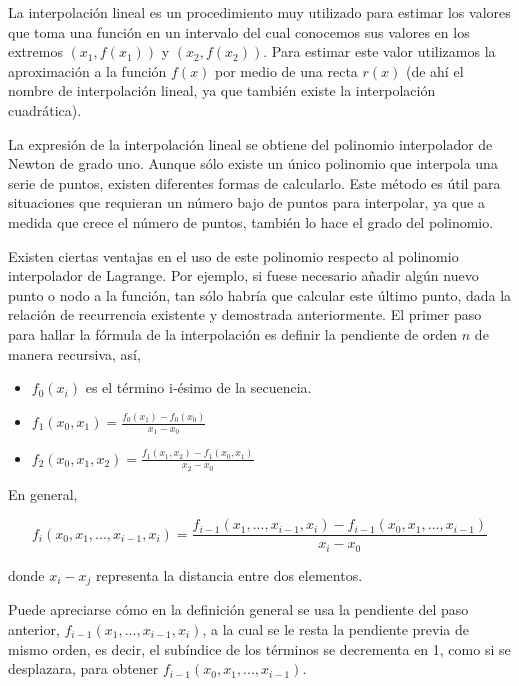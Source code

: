 \documentclass[
  12pt,
]{krantz}
\providecommand{\tightlist}{%
  \setlength{\itemsep}{0pt}\setlength{\parskip}{0pt}}
\begin{document}
La interpolación lineal es un procedimiento muy utilizado para estimar los valores que toma una función en un intervalo del cual conocemos sus valores en los extremos \((x_{1}, f(x_{1}))\) y \((x_{2},f(x_{2}))\). Para estimar este valor utilizamos la aproximación a la función \(f(x)\) por medio de una recta \(r(x)\) (de ahí el nombre de interpolación lineal, ya que también existe la interpolación cuadrática).

La expresión de la interpolación lineal se obtiene del polinomio interpolador de Newton de grado uno. Aunque sólo existe un único polinomio que interpola una serie de puntos, existen diferentes formas de calcularlo. Este método es útil para situaciones que requieran un número bajo de puntos para interpolar, ya que a medida que crece el número de puntos, también lo hace el grado del polinomio.

Existen ciertas ventajas en el uso de este polinomio respecto al polinomio interpolador de Lagrange. Por ejemplo, si fuese necesario añadir algún nuevo punto o nodo a la función, tan sólo habría que calcular este último punto, dada la relación de recurrencia existente y demostrada anteriormente. El primer paso para hallar la fórmula de la interpolación es definir la pendiente de orden \(n\) de manera recursiva, así,

\begin{itemize}
\tightlist
\item
  \(f_{0}(x_{i})\) es el término i-ésimo de la secuencia.
\item
  \(\displaystyle{f_{1}(x_{0},x_{1}) = \frac{f_{0}(x_{1})-f_{0}(x_{0})}{x_{1}-x_{0}}}\)

  \item

  \(\displaystyle{f_{2}(x_{0},x_{1},x_{2}) = \frac{f_{1}(x_{1},x_{2})-f_{1}(x_{0},x_{1})}{x_{2}-x_{0}}}\)
\end{itemize}

En general,

\[\displaystyle{f_{i}(x_{0},x_{1},...,x_{i-1},x_{i}) = \frac{f_{i-1}(x_{1},...,x_{i-1},x_{i})-f_{i-1}(x_{0},x_{1},...,x_{i-1} )}{x_{i}-x_{0}}}\]

donde \(\displaystyle{x_{i}-x_{j}}\) representa la distancia entre dos elementos.

Puede apreciarse cómo en la definición general se usa la pendiente del paso anterior, \(f_{i-1}(x_{1},...,x_{i-1},x_{i})\), a la cual se le resta la pendiente previa de mismo orden, es decir, el subíndice de los términos se decrementa en 1, como si se desplazara, para obtener \(f_{i-1}(x_{0},x_{1},...,x_{i-1})\).
\end{document}
